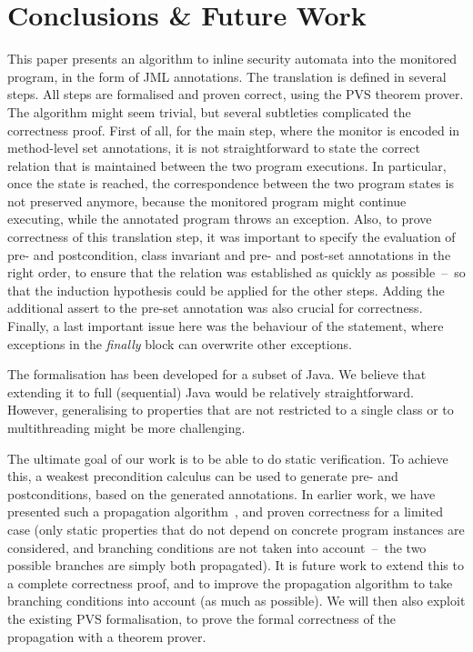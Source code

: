 \section{Conclusions \& Future Work }\label{SecConcl}

This paper presents an algorithm to inline security automata into the
monitored program, in the form of JML annotations. The translation is
defined in several steps. All steps are formalised and proven correct,
using the PVS theorem prover. The algorithm might seem trivial, but
several subtleties complicated the correctness proof. First of all,
for the main step, where the monitor is encoded in method-level set
annotations, it is not straightforward to state the correct relation
that is maintained between the two program executions. In particular,
once the \halted state is reached, the correspondence between the two
program states is not preserved anymore, because the monitored program
might continue executing, while the annotated program throws an
exception. Also, to prove correctness of this translation step, it was
important to specify the evaluation of pre- and postcondition, class
invariant and pre- and post-set annotations in the right order, to ensure
that the relation was established as quickly as possible~--~so that
the induction hypothesis could be applied for the other
steps. Adding the additional assert to the pre-set annotation was also
crucial for correctness.  
Finally, a last important issue here was the behaviour of the
\TryCatch statement, where exceptions in the \emph{finally} block can
overwrite other exceptions.

The formalisation has been developed for a subset of Java. We believe
that extending it to full (sequential) Java would be relatively
straightforward. However, generalising to properties that are not
restricted to a single class or to multithreading might be more
challenging.

The ultimate goal of our work is to be able to do static
verification. To achieve this, a weakest precondition calculus can be
used to generate pre- and postconditions, based on the generated \Set
annotations. In earlier work, we have presented such a propagation
algorithm~\cite{PavlovaBBHL04}, and proven correctness for a limited
case (only static properties that do not depend on concrete program
instances are considered, and branching conditions are not taken into
account~--~the two possible branches are simply both propagated). It
is future work to extend this to a complete correctness proof, and to
improve the propagation algorithm to take branching conditions into
account (as much as possible). We will then also exploit the existing
PVS formalisation, to prove the formal correctness of the propagation
with a theorem prover.
